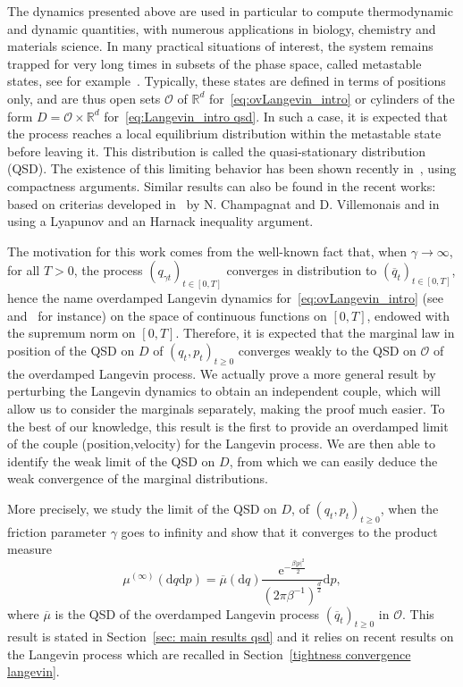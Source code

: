 \documentclass[preprint,EJP]{ejpecp}
\begin{document}
The dynamics presented above are used in particular to
compute thermodynamic and dynamic quantities, with numerous
applications in biology, chemistry and materials science. In many practical situations of interest, the system remains trapped for very long times
in subsets of the phase space, called metastable states, see for
example~\cite[Sections 6.3 and 6.4]{LelSto16}. Typically, these states
are defined in terms of positions only, and are thus open sets $\mathcal{O}$ of $\mathbb{R}^d$ for~\eqref{eq:ovLangevin_intro} or  cylinders of the
form $D=\mathcal{O} \times \mathbb{R}^d$ for~\eqref{eq:Langevin_intro qsd}. In such a case, it is expected that the process reaches a local equilibrium distribution within the metastable state before leaving it. This distribution is called the quasi-stationary distribution (QSD). The existence of this limiting behavior has been shown recently in~\cite{LelRamRey2}, using compactness arguments. Similar results can also be found in the recent works:~\cite[Chapter 4]{RamPHD} based on criterias developed in~\cite{V} by N. Champagnat and D. Villemonais and in~\cite{GuiNectoux} using a Lyapunov and an Harnack inequality argument.

The motivation for this work comes from the well-known fact that, when $\gamma \to \infty$, for all $T>0$, the process $(q_{\gamma t})_{t\in[0,T]}$ converges in distribution to $(\overline{q}_{t})_{t\in[0,T]}$, hence the name overdamped Langevin dynamics for~\eqref{eq:ovLangevin_intro} (see~\cite[Proposition 2.15]{LelRouSto10} and~\cite{Kramers,Freidlin} for instance) on the space of continuous functions on $[0,T]$, endowed with the supremum norm on $[0,T]$. Therefore, it is expected that the marginal law in position of the QSD on $D$ of $(q_t,p_t)_{t\geq0}$ converges weakly to the QSD on $\mathcal{O}$ of the overdamped Langevin process. We actually prove a more general result by perturbing the Langevin dynamics to obtain an independent couple, which will allow us to consider the marginals separately, making the proof much easier. To the best of our knowledge, this result is the first to provide an overdamped limit of the couple (position,velocity) for the Langevin process. We are then able to identify the weak limit of the QSD on $D$, from which we can easily deduce the weak convergence of the marginal distributions.  

More precisely, we study the limit of the QSD on $D$, of $(q_t,p_t)_{t\geq0}$, when the friction parameter $\gamma$ goes to infinity and show that it converges to the product measure
\begin{equation}\label{product structure mu infini}
  \mu^{(\infty)}(\mathrm{d}q\mathrm{d}p) = \overline{\mu}(\mathrm{d}q) \frac{\mathrm{e}^{-\frac{\beta\vert p\vert^2}{2}}}{(2\pi\beta^{-1})^{\frac{d}{2}}}\mathrm{d}p,
\end{equation}
where $\overline{\mu}$ is the QSD of the overdamped Langevin process $(\overline{q}_t)_{t \geq 0}$ in $\mathcal{O}$. This result is stated in Section~\ref{sec: main results qsd} and it relies on recent results on the Langevin process which are recalled in Section~\ref{tightness convergence langevin}.
 
\end{document}
